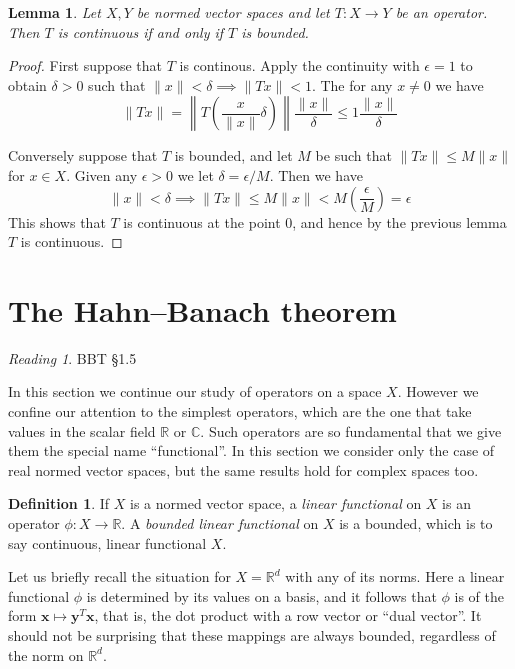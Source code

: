 \documentclass[11pt,oneside]{amsbook}
\newcommand{\RR}{{\mathbb R}}
\newcommand{\CC}{{\mathbb C}}
\theoremstyle{definition}
\theoremstyle{plain}
\newtheorem{lem}[thm]{Lemma}
\theoremstyle{definition}
\newtheorem{defn}[thm]{Definition}
\theoremstyle{remark}
\newtheorem*{reading}{Reading}
\numberwithin{equation}{section}
\numberwithin{figure}{section}
\begin{document}
\begin{lem}
  Let $X,Y$ be normed vector spaces and let $T\colon X\to Y$ be an operator. Then $T$ is continuous if and only if $T$ is bounded.
\end{lem}

\begin{proof}
  First suppose that $T$ is continous. Apply the continuity with $\epsilon=1$ to obtain $\delta>0$ such that $\|x\|<\delta\implies\|Tx\|<1$. The for any $x\neq0$ we have
  \[\|Tx\|=\left\|T\left(\frac{x}{\|x\|}\delta\right)\right\|\frac{\|x\|}{\delta}\leq 1\frac{\|x\|}{\delta}
  \]

  Conversely suppose that $T$ is bounded, and let $M$ be such that $\|Tx\|\leq M\|x\|$ for $x\in X$. Given any $\epsilon>0$ we let $\delta=\epsilon/M$. Then we have
  \[\|x\|<\delta\implies\|Tx\|\leq M\|x\|<M\left(\frac{\epsilon}{M}\right)=\epsilon
  \]
  This shows that $T$ is continuous at the point $0$, and hence by the previous lemma $T$ is continuous.
\end{proof}


\section{The Hahn--Banach theorem}

\begin{reading}
  BBT \S 1.5
\end{reading}

In this section we continue our study of operators on a space $X$. However we confine our attention to the simplest operators, which are the one that take values in the scalar field $\RR$ or $\CC$. Such operators are so fundamental that we give them the special name ``functional''. In this section we consider only the case of real normed vector spaces, but the same results hold for complex spaces too.

\begin{defn}
  If $X$ is a normed vector space, a \emph{linear functional} on $X$ is an operator $\phi\colon X\to\RR$. A \emph{bounded linear functional} on $X$ is a bounded, which is to say continuous, linear functional $X$.
\end{defn}

Let us briefly recall the situation for $X=\RR^d$ with any of its norms. Here a linear functional $\phi$ is determined by its values on a basis, and it follows that $\phi$ is of the form $\mathbf{x}\mapsto\mathbf{y}^T\mathbf{x}$, that is, the dot product with a row vector or ``dual vector''. It should not be surprising that these mappings are always bounded, regardless of the norm on $\RR^d$.
\end{document}
